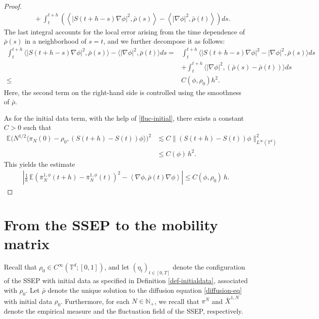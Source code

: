 \documentclass[UTF-8,reqno]{amsart}
\numberwithin{equation}{section}
\def\leq{\leqslant}
\def\leq{\leqslant}
\begin{document}
\begin{proof}
\begin{align*}
&\quad + \int_t^{t+h} \left( \left\langle \left| S(t+h-s)\nabla\phi \right|^2, \bar{\rho}(s) \right\rangle 
- \left\langle |\nabla\phi|^2, \bar{\rho}(t) \right\rangle \right) ds.
\end{align*}
The last integral accounts for the local error arising from the time dependence of $\bar{\rho}(s)$ in a neighborhood of $s = t$, and we further decompose it as follows:
\begin{align*}
	\int^{t+h}_t\langle|S(t+h-s)\nabla\phi|^2,\bar{\rho}(s)\rangle-\langle|\nabla\phi|^2,\bar{\rho}(t)\rangle ds
	=&\int^{t+h}_t\langle|S(t+h-s)\nabla\phi|^2-|\nabla\phi|^2,\bar{\rho}(s)\rangle ds \\
	&+\int^{t+h}_t\langle|\nabla\phi|^2,(\bar{\rho}(s)-\bar{\rho}(t))\rangle ds \\
	\leq& C(\phi,\rho_0)h^2.
\end{align*}
Here, the second term on the right-hand side is controlled using the smoothness of $\bar{\rho}$. 

As for the initial data term, with the help of \eqref{fluc-initial}, there exists a constant $C>0$ such that
\begin{align*}
	\mathbb{E}\Big(N^{1/2}\big\langle \pi_N(0) - \rho_0, (S(t+h) - S(t))\phi \big\rangle\Big)^2 
	&\lesssim C\|(S(t+h) - S(t))\phi\|_{L^{\infty}(\mathbb{T}^d)}^2 \\
	&\leq C(\phi) \, h^2.
\end{align*}
This yields the estimate
\begin{align*}
\left| \frac{1}{h} \, \mathbb{E} \left( \bar{\pi}^{1,\phi}_N(t+h) - \bar{\pi}^{1,\phi}_N(t) \right)^2 - \left\langle \nabla \phi, \bar{\rho}(t) \nabla \phi \right\rangle \right| \leq C(\phi, \rho_0) \, h.
\end{align*} 





\end{proof}


\section{From the SSEP to the mobility matrix}\label{sec-4}
Recall that $\rho_0 \in C^{\infty}(\mathbb{T}^d;[0,1])$, and let $(\eta_t)_{t\in[0,T]}$ denote the configuration of the SSEP with initial data as specified in Definition \ref{def-initialdata}, associated with $\rho_0$. Let $\bar{\rho}$ denote the unique solution to the diffusion equation \eqref{diffusion-eq} with initial data $\rho_0$. Furthermore, for each $N \in \mathbb{N}_+$, we recall that $\pi^N$ and $\bar{X}^{1,N}$ denote the empirical measure and the fluctuation field of the SSEP, respectively. 
\end{document}
